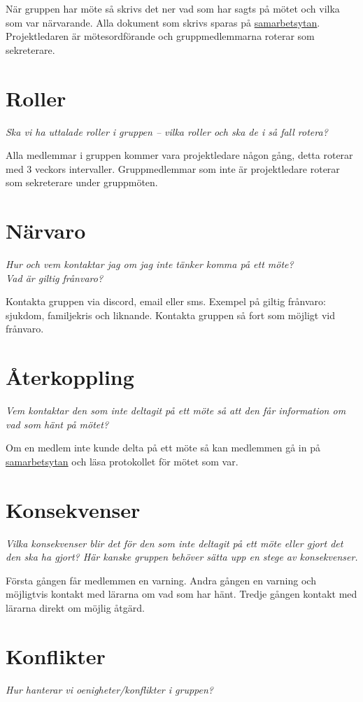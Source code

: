När gruppen har möte så skrivs det ner vad som har sagts på mötet och vilka som var närvarande. Alla dokument som skrivs sparas på \href{https://github.com/anhility/DVA227}{samarbetsytan}. Projektledaren är mötesordförande och gruppmedlemmarna roterar som sekreterare.

\section*{Roller}
\textit{Ska vi ha uttalade roller i gruppen – vilka roller och ska de i så fall rotera?}

Alla medlemmar i gruppen kommer vara projektledare någon gång, detta roterar med 3 veckors intervaller. Gruppmedlemmar som inte är projektledare roterar som sekreterare under gruppmöten.

\section*{Närvaro}
\textit{Hur och vem kontaktar jag om jag inte tänker komma på ett möte? \\
Vad är giltig frånvaro?}

Kontakta gruppen via discord, email eller sms. Exempel på giltig frånvaro: sjukdom, familjekris och liknande. Kontakta gruppen så fort som möjligt vid frånvaro.

\section*{Återkoppling}
\textit{Vem kontaktar den som inte deltagit på ett möte så att den får information om vad som hänt på mötet?}

Om en medlem inte kunde delta på ett möte så kan medlemmen gå in på \href{https://github.com/anhility/DVA227}{samarbetsytan} och läsa protokollet för mötet som var.

\section*{Konsekvenser}
\textit{Vilka konsekvenser blir det för den som inte deltagit på ett möte eller gjort det den ska ha gjort? Här kanske gruppen behöver sätta upp en stege av konsekvenser.}

Första gången får medlemmen en varning. Andra gången en varning och möjligtvis kontakt med lärarna om vad som har hänt. Tredje gången kontakt med lärarna direkt om möjlig åtgärd.

\section*{Konflikter}
\textit{Hur hanterar vi oenigheter/konflikter i gruppen?}

